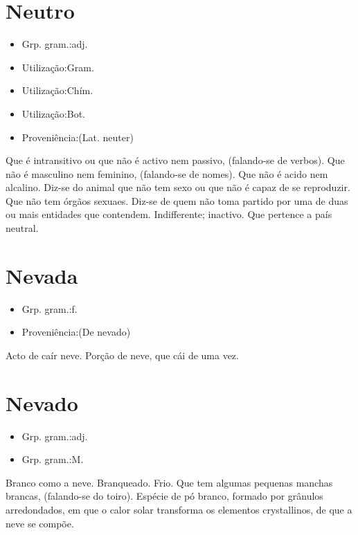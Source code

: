 \section{Neutro}
\begin{itemize}
\item {Grp. gram.:adj.}
\end{itemize}
\begin{itemize}
\item {Utilização:Gram.}
\end{itemize}
\begin{itemize}
\item {Utilização:Chím.}
\end{itemize}
\begin{itemize}
\item {Utilização:Bot.}
\end{itemize}
\begin{itemize}
\item {Proveniência:(Lat. \textunderscore neuter\textunderscore )}
\end{itemize}
Que é intransitivo ou que não é activo nem passivo, (falando-se de verbos).
Que não é masculino nem feminino, (falando-se de nomes).
Que não é acido nem alcalino.
Diz-se do animal que não tem sexo ou que não é capaz de se reproduzir.
Que não tem órgãos sexuaes.
Diz-se de quem não toma partido por uma de duas ou mais entidades que contendem.
Indifferente; inactivo.
Que pertence a país neutral.
\section{Nevada}
\begin{itemize}
\item {Grp. gram.:f.}
\end{itemize}
\begin{itemize}
\item {Proveniência:(De \textunderscore nevado\textunderscore )}
\end{itemize}
Acto de caír neve.
Porção de neve, que cái de uma vez.
\section{Nevado}
\begin{itemize}
\item {Grp. gram.:adj.}
\end{itemize}
\begin{itemize}
\item {Grp. gram.:M.}
\end{itemize}
Branco como a neve.
Branqueado.
Frio.
Que tem algumas pequenas manchas brancas, (falando-se do toiro).
Espécie de pó branco, formado por grânulos arredondados, em que o calor solar transforma os elementos crystallinos, de que a neve se compõe.

